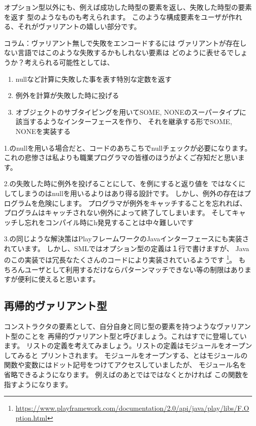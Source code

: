 \documentclass[11pt,a4paper]{article}
\begin{document}
オプション型以外にも、例えば成功した時型の要素を返し、失敗した時型の要素を返す
型のようなものも考えられます。
このような構成要素をユーザが作れる、それがヴァリアントの嬉しい部分です。

\begin{itembox}[l]{コラム：ヴァリアント無しで失敗をエンコードするには}
ヴァリアントが存在しない言語ではこのような失敗するかもしれない要素は
どのように表せるでしょうか？考えられる可能性としては、
\begin{enumerate}
\item nullなど計算に失敗した事を表す特別な定数を返す
\item 例外を計算が失敗した時に投げる
\item オブジェクトのサブタイピングを用いてSOME, NONEのスーパータイプに該当するようなインターフェースを作り、
  それを継承する形でSOME, NONEを実装する
\end{enumerate}

1.のnullを用いる場合だと、コードのあちこちでnullチェックが必要になります。
これの悲惨さは私よりも職業プログラマの皆様のほうがよくご存知だと思います。

2.の失敗した時に例外を投げることにして、を例にすると返り値を
ではなくにしてしまうのはnullを用いるよりはあり得る設計です。
しかし、例外の存在はプログラムを危険にします。
プログラマが例外をキャッチすることを忘れれば、
プログラムはキャッチされない例外によって終了してしまいます。
そしてキャッチし忘れをコンパイル時にh発見することは中々難しいです

3.の同じような解決策はPlayフレームワークのJavaインターフェースにも実装されています。
しかし、SMLではオプション型の定義は１行で書けますが、
Javaのこの実装では冗長なたくさんのコードにより実装されているようです
\footnote{\url{https://www.playframework.com/documentation/2.0/api/java/play/libs/F.Option.html}}。
もちろんユーザとして利用するだけならパターンマッチできない等の制限はありますが便利に使えると思います。
\end{itembox}

\subsection{再帰的ヴァリアント型}

コンストラクタの要素として、自分自身と同じ型の要素を持つようなヴァリアント型のことを
再帰的ヴァリアント型と呼びましょう。これはすでに登場しています。
リストの定義を考えてみましょう。リストの定義はモジュールをオープンしてみると
プリントされます。
モジュールをオープンする、とはモジュールの関数や変数にはドット記号をつけてアクセスしていましたが、
モジュール名を省略できるようになります。
例えばのあとではではなくとかければ
この関数を指すようになります。
\end{document}
